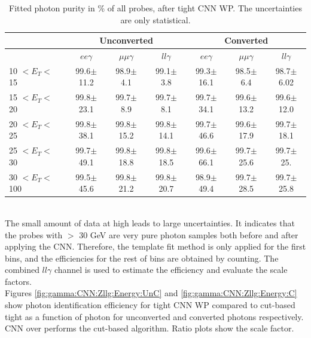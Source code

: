 \begin{table}[htbp]
\centering
\begin{tabular}{lcccccc}
\hline\hline
                             & \multicolumn{3}{c}{Unconverted}               & \multicolumn{3}{c}{Converted}                \\
                            \hline

%
                             & $ee\gamma$           & $\mu\mu\gamma$           & $ll\gamma$           & $ee\gamma$           &  $\mu\mu\gamma$          & $ll\gamma$           \\
    \hline
10 $ < E_T < $ 15 & 99.6$\pm$11.2    & 98.9$\pm$4.1       & 99.1$\pm$3.8    & 99.3$\pm$16.1    & 98.5$\pm$6.4     & 98.7$\pm$6.02  \\
15 $ < E_T < $ 20 & 99.8$\pm$23.1    & 99.7$\pm$8.9       & 99.7$\pm$8.1    & 99.7$\pm$34.1    & 99.6$\pm$13.2    & 99.6$\pm$12.0 \\
20 $ < E_T < $ 25 & 99.8$\pm$38.1    & 99.8$\pm$15.2      & 99.8$\pm$14.1   & 99.7$\pm$46.6    & 99.6$\pm$17.9    & 99.7$\pm$18.1  \\
25 $ < E_T < $ 30  & 99.7$\pm$49.1   & 99.8$\pm$18.8      & 99.8$\pm$18.5   & 99.6$\pm$66.1    & 99.7$\pm$25.6    & 99.7$\pm$25.    \\
30 $ < E_T < $ 100 & 99.5$\pm$45.6   & 99.8$\pm$21.2      & 99.8$\pm$20.7   & 98.9$\pm$49.4    & 99.7$\pm$28.5    & 99.7$\pm$25.8     \\
\hline\hline
\end{tabular}
\begin{tcolorbox}[colback=black!5!white,colframe=white!75!black]
\caption{Fitted photon purity in \%  of all probes, after tight CNN WP. The uncertainties are only statistical.}
\label{tab:gamma:CNN:Zllg:Purity:A}
\end{tcolorbox}
\end{table}
\\
The small amount of data at high \eT leads to large uncertainties. It indicates that the probes with \eT $>$ 30 GeV are very pure photon samples both before and after applying the CNN. Therefore, the template fit method is only applied for the first \eT bins, and the efficiencies for the rest of bins are obtained by counting. The combined $ll\gamma$ channel is used to estimate the efficiency and evaluate the scale factors.   \\
Figures \ref{fig:gamma:CNN:Zllg:Energy:UnC} and \ref{fig:gamma:CNN:Zllg:Energy:C} show photon identification efficiency for tight CNN WP compared to cut-based tight as a function of photon \eT for unconverted and converted photons respectively. CNN over performs the cut-based algorithm. Ratio plots show the scale factor.
